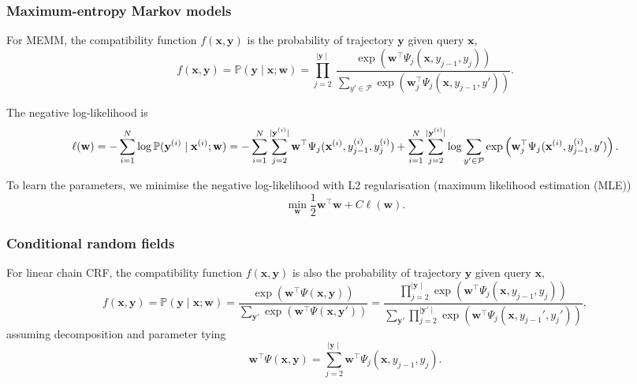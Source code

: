 \documentclass[9pt]{extarticle}
\begin{document}
\subsubsection{Maximum-entropy Markov models}
\label{sec:memm}

For MEMM, the compatibility function $f(\mathbf{x}, \mathbf{y})$ is the probability of trajectory $\mathbf{y}$ given query $\mathbf{x}$,
\begin{equation*}
f(\mathbf{x}, \mathbf{y}) = \mathbb{P}(\mathbf{y} \mid \mathbf{x}; \mathbf{w}) 
                          = \prod_{j=2}^{\mid \mathbf{y} \mid}~
                            \frac{\exp \left(\mathbf{w}^\top \Psi_j(\mathbf{x}, y_{j-1}, y_j) \right)}
                                 {\sum_{y' \in \mathcal{P}} \exp \left(\mathbf{w}_j^\top \Psi_j(\mathbf{x}, y_{j-1}, y') \right)}.
\end{equation*}

The negative log-likelihood is 
\begin{equation*}
\ell(\mathbf{w}) = -\sum_{i=1}^N \log \mathbb{P}(\mathbf{y}^{(i)} \mid \mathbf{x}^{(i)}; \mathbf{w}) \\
                 = -\sum_{i=1}^N \sum_{j=2}^{\mid \mathbf{y}^{(i)} \mid} 
                    \mathbf{w}^\top \Psi_j(\mathbf{x}^{(i)}, y_{j-1}^{(i)}, y_j^{(i)}) +
                    \sum_{i=1}^N \sum_{j=2}^{\mid \mathbf{y}^{(i)} \mid} 
                    \log \sum_{y' \in \mathcal{P}} \exp \left(\mathbf{w}_j^\top \Psi_j(\mathbf{x}^{(i)}, y_{j-1}^{(i)}, y') \right).
\end{equation*}

To learn the parameters, we minimise the negative log-likelihood with L2 regularisation (maximum likelihood estimation (MLE))
\begin{equation*}
\min_{\mathbf{w}} \frac{1}{2} \mathbf{w}^\top \mathbf{w} + C \ell(\mathbf{w}).
\end{equation*}


\subsubsection{Conditional random fields}
\label{sec:crf}

For linear chain CRF, the compatibility function $f(\mathbf{x}, \mathbf{y})$ is also the probability of trajectory $\mathbf{y}$ given query $\mathbf{x}$,
\begin{equation*}
f(\mathbf{x}, \mathbf{y}) = \mathbb{P}(\mathbf{y} \mid \mathbf{x}; \mathbf{w}) 
= \frac{\exp \left( \mathbf{w}^\top \Psi(\mathbf{x}, \mathbf{y}) \right)}
       {\sum_{\mathbf{y}'} \exp \left( \mathbf{w}^\top \Psi(\mathbf{x}, \mathbf{y}') \right)}
= \frac{\prod_{j=2}^{\mid \mathbf{y} \mid} \exp \left( \mathbf{w}^\top \Psi_j(\mathbf{x}, y_{j-1}, y_j) \right)}
       {\sum_{\mathbf{y}'} \prod_{j=2}^{\mid \mathbf{y}' \mid} \exp \left( \mathbf{w}^\top \Psi_j(\mathbf{x}, y_{j-1}', y_j') \right)},
\end{equation*}
assuming decomposition and parameter tying
\begin{equation*}
\mathbf{w}^\top \Psi(\mathbf{x}, \mathbf{y}) = \sum_{j=2}^{\mid \mathbf{y} \mid} \mathbf{w}^\top \Psi_j(\mathbf{x}, y_{j-1}, y_j).
\end{equation*}
\end{document}
